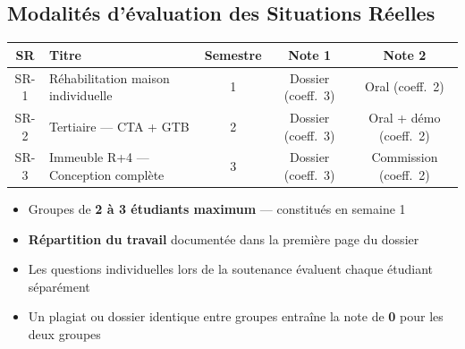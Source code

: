 \documentclass[11pt, french, openany]{report}
\begin{document}
\begin{tcolorbox}[
  enhanced, colback=FedGreen!8, colframe=FedGreen, arc=3pt,
  fonttitle=\bfseries\sffamily, coltitle=white, colbacktitle=FedGreen,
  title={Distinction des 3 fascicules du cours BTS FED GCF}
]
\begin{center}
\end{center}
\end{tcolorbox}

\subsection*{Modalités d'évaluation des Situations Réelles}

\begin{center}
\begin{tabular}{clccc}
  \toprule
  \textbf{SR} & \textbf{Titre} & \textbf{Semestre} & \textbf{Note 1} & \textbf{Note 2} \\
  \midrule
  SR-1 & Réhabilitation maison individuelle & 1 & Dossier (coeff.\ 3) & Oral (coeff.\ 2) \\
  SR-2 & Tertiaire — CTA + GTB & 2 & Dossier (coeff.\ 3) & Oral + démo (coeff.\ 2) \\
  SR-3 & Immeuble R+4 — Conception complète & 3 & Dossier (coeff.\ 3) & Commission (coeff.\ 2) \\
  \bottomrule
\end{tabular}
\end{center}

\begin{attention}
  \begin{itemize}
    \item Groupes de \textbf{2 à 3 étudiants maximum} — constitués en semaine 1
    \item \textbf{Répartition du travail} documentée dans la première page du dossier
    \item Les questions individuelles lors de la soutenance évaluent chaque étudiant séparément
    \item Un plagiat ou dossier identique entre groupes entraîne la note de \textbf{0} pour les deux groupes
  \end{itemize}
\end{attention}

\newpage







\end{document}
